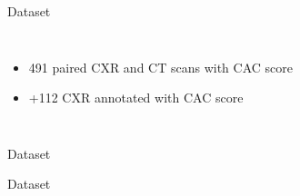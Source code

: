 \documentclass[compress,aspectratio=169,xcolor=table]{beamer}
\begin{document}
\begin{frame}{Dataset}
	\begin{columns}[onlytextwidth]
			\begin{itemize}
				\item 491 paired CXR and CT scans with CAC score
				\item +112 CXR annotated with CAC score
			\end{itemize}
		\begin{figure}
		\end{figure}
	\end{columns}
\end{frame}


\begin{frame}{Dataset}
	\begin{figure}
		\centering
		\begin{subfigure}[b]{0.45\textwidth}
			\resizebox{\textwidth}{\textwidth}{  }
		\end{subfigure}
		\begin{subfigure}[b]{0.45\textwidth}
			\resizebox{\textwidth}{\textwidth}{  }
		\end{subfigure}
	\end{figure}
\end{frame}


\begin{frame}{Dataset}
	\begin{figure}
		\centering
		\begin{subfigure}[b]{0.45\textwidth}
			\resizebox{\textwidth}{\textwidth}{  }
		\end{subfigure}
		\begin{subfigure}[b]{0.45\textwidth}
			\resizebox{\textwidth}{\textwidth}{  }
		\end{subfigure}\hspace{1em}
	\end{figure}
\end{frame}
\end{document}
